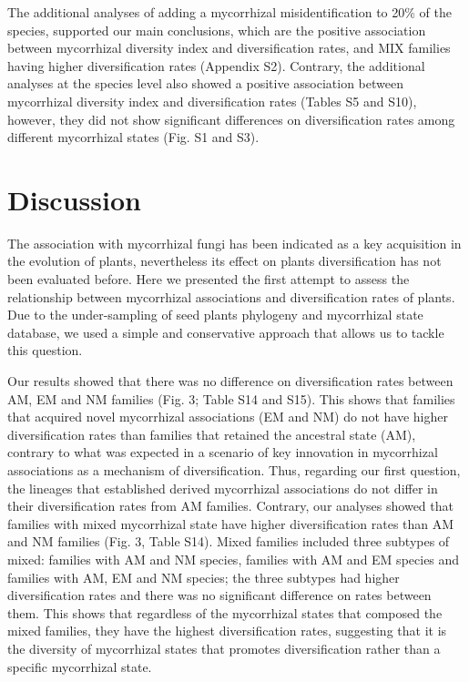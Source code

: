 \documentclass[12pt,]{article}
\begin{document}
The additional analyses of adding a mycorrhizal misidentification to
20\% of the species, supported our main conclusions, which are the
positive association between mycorrhizal diversity index and
diversification rates, and MIX families having higher diversification
rates (Appendix S2). Contrary, the additional analyses at the species
level also showed a positive association between mycorrhizal diversity
index and diversification rates (Tables S5 and S10), however, they did
not show significant differences on diversification rates among
different mycorrhizal states (Fig. S1 and S3).

\hypertarget{discussion}{%
\section{Discussion}\label{discussion}}

The association with mycorrhizal fungi has been indicated as a key
acquisition in the evolution of plants, nevertheless its effect on
plants diversification has not been evaluated before. Here we presented
the first attempt to assess the relationship between mycorrhizal
associations and diversification rates of plants. Due to the
under-sampling of seed plants phylogeny and mycorrhizal state database,
we used a simple and conservative approach that allows us to tackle this
question.

Our results showed that there was no difference on diversification rates
between AM, EM and NM families (Fig. 3; Table S14 and S15). This shows
that families that acquired novel mycorrhizal associations (EM and NM)
do not have higher diversification rates than families that retained the
ancestral state (AM), contrary to what was expected in a scenario of key
innovation in mycorrhizal associations as a mechanism of
diversification. Thus, regarding our first question, the lineages that
established derived mycorrhizal associations do not differ in their
diversification rates from AM families. Contrary, our analyses showed
that families with mixed mycorrhizal state have higher diversification
rates than AM and NM families (Fig. 3, Table S14). Mixed families
included three subtypes of mixed: families with AM and NM species,
families with AM and EM species and families with AM, EM and NM species;
the three subtypes had higher diversification rates and there was no
significant difference on rates between them. This shows that regardless
of the mycorrhizal states that composed the mixed families, they have
the highest diversification rates, suggesting that it is the diversity
of mycorrhizal states that promotes diversification rather than a
specific mycorrhizal state.
\end{document}

